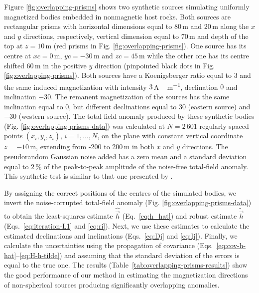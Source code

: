 \documentclass[journal abbreviation, npg]{copernicus}
\begin{document}
Figure \ref{fig:overlapping-prisms} shows two synthetic sources
simulating uniformly magnetized bodies embedded in nonmagnetic 
host rocks. Both sources are rectangular prisms with 
horizontal dimensions equal to 80\,\unit{m} and 20\,\unit{m} along
the $x$ and $y$ directions, respectively, vertical dimension
equal to 70\,\unit{m} and depth of the top at $z = 10$\,\unit{m}
(red prisms in Fig. \ref{fig:overlapping-prisms}).
One source has its centre at $xc = 0$\,\unit{m}, $yc = -30$\,\unit{m}
and $zc = 45$\,\unit{m} while the other one has its centre shifted
60\,\unit{m} in the positive $y$ direction (pinpointed black dots
in Fig. \ref{fig:overlapping-prisms}). Both sources
have a Koenigsberger ratio equal to $3$ and the same induced 
magnetization with intensity $3$\,\unit{A\,m^{-1}}, declination 
$0${\degree} and inclination $-30${\degree}. The remanent 
magnetization of the sources has the same inclination equal to 
$0${\degree}, but different declinations equal to $30${\degree}
(eastern source) and $-30${\degree} (western source). The total field
anomaly produced by these synthetic bodies (Fig. 
\ref{fig:overlapping-prisms-data}) was calculated at $N = 2\,601$
regularly spaced points $(x_{i}, y_{i}, z_{i})$, $i = 1, \ldots, N$, on 
the plane with constant vertical coordinate $z=-10$\,\unit{m}, extending 
from -200 to 200\,\unit{m} in both $x$ and $y$ directions. The 
pseudorandom Gaussian noise added has a zero mean and a standard deviation 
equal to $2\,\%$ of the peak-to-peak amplitude of the noise-free total-field
anomaly. This synthetic test is similar to that one presented by
\citet{lelievre-oldenburg2009}.

By assigning the correct positions of the centres of the simulated bodies, we
invert the noise-corrupted total-field anomaly (Fig. 
\ref{fig:overlapping-prisms-data}) to obtain the least-squares estimate 
$\hat{\vec{h}}$ (Eq.~\ref{eq:h_hat}) and
robust estimate $\tilde{\vec{h}}$ (Eqs.~\ref{eq:iteration-L1} and
\ref{eq:ri}). Next, we use these estimates to calculate the estimated
declinations and inclinations (Eqs.~\ref{eq:Dj} and \ref{eq:Ij}). Finally, we
calculate the uncertainties using the propagation of covariance
(Eqs.~\ref{eq:cov-h-hat}--\ref{eq:H-h-tilde}) and assuming that the standard
deviation of the errors is equal to the true one. The
results (Table~\ref{tab:overlapping-prisms-results}) show the good
performance of our method in estimating the magnetization directions of
non-spherical sources producing significantly overlapping anomalies. 
\end{document}

